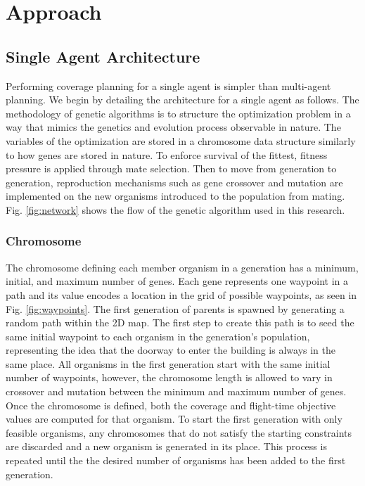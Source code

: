 \documentclass[letterpaper, 10 pt, conference]{ieeeconf}  %
\begin{document}
\section{Approach}\label{approach}
\subsection{Single Agent Architecture}

Performing coverage planning for a single agent is simpler than multi-agent planning. We begin by detailing the architecture for a single agent as follows. The methodology of genetic algorithms is to structure the optimization problem in a way that mimics the genetics and evolution process observable in nature. The variables of the optimization are stored in a chromosome data structure similarly to how genes are stored in nature. To enforce survival of the fittest, fitness pressure is applied through mate selection. Then to move from generation to generation, reproduction mechanisms such as gene crossover and mutation are implemented on the new organisms introduced to the population from mating. Fig. \ref{fig:network} shows the flow of the genetic algorithm used in this research.

\subsubsection{Chromosome}

The chromosome defining each member organism in a generation has a minimum, initial, and maximum number of genes. Each gene represents one waypoint in a path and its value encodes a location in the grid of possible waypoints, as seen in Fig. \ref{fig:waypoints}. The first generation of parents is spawned by generating a random path within the 2D map. The first step to create this path is to seed the same initial waypoint to each organism in the generation's population, representing the idea that the doorway to enter the building is always in the same place. All organisms in the first generation start with the same initial number of waypoints, however, the chromosome length is allowed to vary in crossover and mutation between the minimum and maximum number of genes. Once the chromosome is defined, both the coverage and flight-time objective values are computed for that organism. To start the first generation with only feasible organisms, any chromosomes that do not satisfy the starting constraints are discarded and a new organism is generated in its place. This process is repeated until the the desired number of organisms has been added to the first generation.
\end{document}
